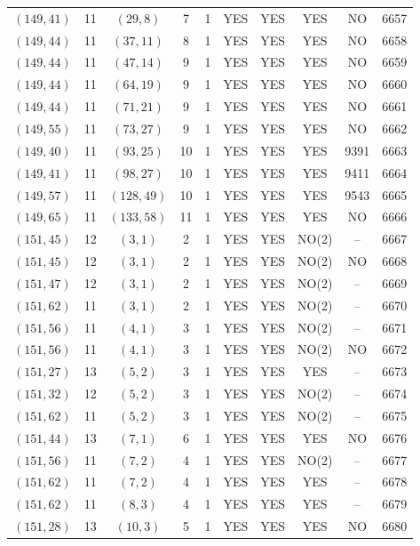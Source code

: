 \begin{longtable}{|c|c|c|c|c|c|c|c|c|c|}
$(149, 41)$ & 11 & $(29, 8)$ & 7 & 1 & YES & YES & YES & NO & 6657\\
$(149, 44)$ & 11 & $(37, 11)$ & 8 & 1 & YES & YES & YES & NO & 6658\\
$(149, 44)$ & 11 & $(47, 14)$ & 9 & 1 & YES & YES & YES & NO & 6659\\
$(149, 44)$ & 11 & $(64, 19)$ & 9 & 1 & YES & YES & YES & NO & 6660\\
$(149, 44)$ & 11 & $(71, 21)$ & 9 & 1 & YES & YES & YES & NO & 6661\\
$(149, 55)$ & 11 & $(73, 27)$ & 9 & 1 & YES & YES & YES & NO & 6662\\
$(149, 40)$ & 11 & $(93, 25)$ & 10 & 1 & YES & YES & YES & 9391 & 6663\\
$(149, 41)$ & 11 & $(98, 27)$ & 10 & 1 & YES & YES & YES & 9411 & 6664\\
$(149, 57)$ & 11 & $(128, 49)$ & 10 & 1 & YES & YES & YES & 9543 & 6665\\
$(149, 65)$ & 11 & $(133, 58)$ & 11 & 1 & YES & YES & YES & NO & 6666\\
$(151, 45)$ & 12 & $(3, 1)$ & 2 & 1 & YES & YES & NO(2) & -- & 6667\\
$(151, 45)$ & 12 & $(3, 1)$ & 2 & 1 & YES & YES & NO(2) & NO & 6668\\
$(151, 47)$ & 12 & $(3, 1)$ & 2 & 1 & YES & YES & NO(2) & -- & 6669\\
$(151, 62)$ & 11 & $(3, 1)$ & 2 & 1 & YES & YES & NO(2) & -- & 6670\\
$(151, 56)$ & 11 & $(4, 1)$ & 3 & 1 & YES & YES & NO(2) & -- & 6671\\
$(151, 56)$ & 11 & $(4, 1)$ & 3 & 1 & YES & YES & NO(2) & NO & 6672\\
$(151, 27)$ & 13 & $(5, 2)$ & 3 & 1 & YES & YES & YES & -- & 6673\\
$(151, 32)$ & 12 & $(5, 2)$ & 3 & 1 & YES & YES & NO(2) & -- & 6674\\
$(151, 62)$ & 11 & $(5, 2)$ & 3 & 1 & YES & YES & NO(2) & -- & 6675\\
$(151, 44)$ & 13 & $(7, 1)$ & 6 & 1 & YES & YES & YES & NO & 6676\\
$(151, 56)$ & 11 & $(7, 2)$ & 4 & 1 & YES & YES & NO(2) & -- & 6677\\
$(151, 62)$ & 11 & $(7, 2)$ & 4 & 1 & YES & YES & YES & -- & 6678\\
$(151, 62)$ & 11 & $(8, 3)$ & 4 & 1 & YES & YES & YES & -- & 6679\\
$(151, 28)$ & 13 & $(10, 3)$ & 5 & 1 & YES & YES & YES & NO & 6680\\

\end{longtable}
